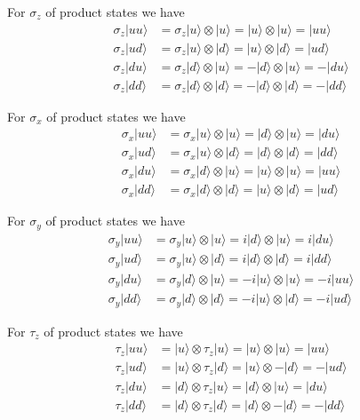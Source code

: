 For $\sigma_z$ of product states we have
\begin{align*}
\sigma_z|uu\rangle&=\sigma_z|u\rangle\otimes|u\rangle
=|u\rangle\otimes|u\rangle=|uu\rangle
\\[1ex]
\sigma_z|ud\rangle&=\sigma_z|u\rangle\otimes|d\rangle
=|u\rangle\otimes|d\rangle=|ud\rangle
\\[1ex]
\sigma_z|du\rangle&=\sigma_z|d\rangle\otimes|u\rangle
=-|d\rangle\otimes|u\rangle=-|du\rangle
\\[1ex]
\sigma_z|dd\rangle&=\sigma_z|d\rangle\otimes|d\rangle
=-|d\rangle\otimes|d\rangle=-|dd\rangle
\end{align*}

For $\sigma_x$ of product states we have
\begin{align*}
\sigma_x|uu\rangle&=\sigma_x|u\rangle\otimes|u\rangle
=|d\rangle\otimes|u\rangle=|du\rangle
\\[1ex]
\sigma_x|ud\rangle&=\sigma_x|u\rangle\otimes|d\rangle
=|d\rangle\otimes|d\rangle=|dd\rangle
\\[1ex]
\sigma_x|du\rangle&=\sigma_x|d\rangle\otimes|u\rangle
=|u\rangle\otimes|u\rangle=|uu\rangle
\\[1ex]
\sigma_x|dd\rangle&=\sigma_x|d\rangle\otimes|d\rangle
=|u\rangle\otimes|d\rangle=|ud\rangle
\end{align*}

For $\sigma_y$ of product states we have
\begin{align*}
\sigma_y|uu\rangle&=\sigma_y|u\rangle\otimes|u\rangle
=i|d\rangle\otimes|u\rangle=i|du\rangle
\\[1ex]
\sigma_y|ud\rangle&=\sigma_y|u\rangle\otimes|d\rangle
=i|d\rangle\otimes|d\rangle=i|dd\rangle
\\[1ex]
\sigma_y|du\rangle&=\sigma_y|d\rangle\otimes|u\rangle
=-i|u\rangle\otimes|u\rangle=-i|uu\rangle
\\[1ex]
\sigma_y|dd\rangle&=\sigma_y|d\rangle\otimes|d\rangle
=-i|u\rangle\otimes|d\rangle=-i|ud\rangle
\end{align*}

For $\tau_z$ of product states we have
\begin{align*}
\tau_z|uu\rangle&=|u\rangle\otimes\tau_z|u\rangle
=|u\rangle\otimes|u\rangle=|uu\rangle
\\[1ex]
\tau_z|ud\rangle&=|u\rangle\otimes\tau_z|d\rangle
=|u\rangle\otimes-|d\rangle=-|ud\rangle
\\[1ex]
\tau_z|du\rangle&=|d\rangle\otimes\tau_z|u\rangle
=|d\rangle\otimes|u\rangle=|du\rangle
\\[1ex]
\tau_z|dd\rangle&=|d\rangle\otimes\tau_z|d\rangle
=|d\rangle\otimes-|d\rangle=-|dd\rangle
\end{align*}

